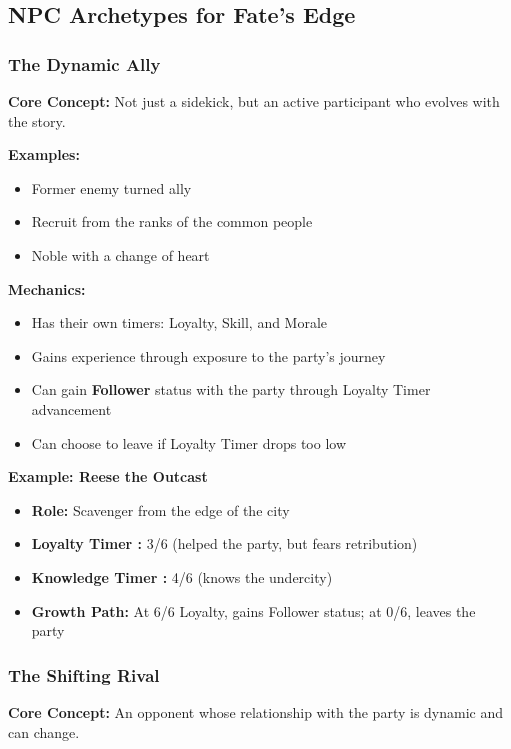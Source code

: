 \documentclass[10pt]{article}
\begin{document}
\subsection{NPC Archetypes for Fate's Edge}

\subsubsection{The Dynamic Ally}

\textbf{Core Concept:} Not just a sidekick, but an active participant who evolves with the story.

\textbf{Examples:}
\begin{itemize}
  \item Former enemy turned ally
  \item Recruit from the ranks of the common people
  \item Noble with a change of heart
\end{itemize}

\textbf{Mechanics:}
\begin{itemize}
  \item Has their own timers: Loyalty, Skill, and Morale
  \item Gains experience through exposure to the party's journey
  \item Can gain \textbf{Follower} status with the party through Loyalty Timer advancement
  \item Can choose to leave if Loyalty Timer drops too low
\end{itemize}

\textbf{Example: Reese the Outcast}
\begin{itemize}
  \item \textbf{Role:} Scavenger from the edge of the city
  \item \textbf{Loyalty Timer :} 3/6 (helped the party, but fears retribution)
  \item \textbf{Knowledge Timer :} 4/6 (knows the undercity)
  \item \textbf{Growth Path:} At 6/6 Loyalty, gains Follower status; at 0/6, leaves the party
\end{itemize}

\subsubsection{The Shifting Rival}

\textbf{Core Concept:} An opponent whose relationship with the party is dynamic and can change.
\end{document}
